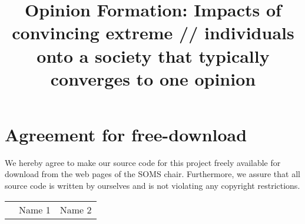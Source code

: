 \documentclass[11pt]{article}
\title{Opinion Formation: Impacts of convincing extreme //
individuals onto a society that typically converges to one opinion}
\begin{document}

\newpage


\newpage
\section*{Agreement for free-download}
\bigskip


\bigskip


\large We hereby agree to make our source code for this project freely available for download from the web pages of the SOMS chair. Furthermore, we assure that all source code is written by ourselves and is not violating any copyright restrictions.

\begin{center}

\bigskip


\bigskip


\begin{tabular}{@{}p{3.3cm}@{}p{6cm}@{}@{}p{6cm}@{}}
\begin{minipage}{3cm}

\end{minipage}
&
\begin{minipage}{6cm}
\vspace{2mm} \large Name 1

 \vspace{\baselineskip}

\end{minipage}
&
\begin{minipage}{6cm}

\large Name 2

\end{minipage}
\end{tabular}


\end{center}
\newpage







\tableofcontents

\newpage

\end{document}
